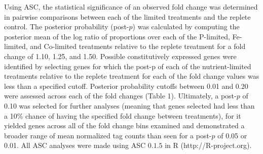 Using ASC, the statistical significance of an observed fold change was determined in pairwise comparisons between each of the limited treatments and the replete control. The posterior probability (post-$p$) was calculated by computing the posterior mean of the log ratio of proportions over each of the P-limited, Fe-limited, and Co-limited treatments relative to the replete treatment for a fold change of 1.10, 1.25, and 1.50. Possible constitutively expressed genes were identified by selecting genes for which the post-p of each of the nutrient-limited treatments relative to the replete treatment for each of the fold change values was less than a specified cutoff. Posterior probability cutoffs between 0.01 and 0.20 were assessed across each of the fold changes (Table 1). Ultimately, a post-$p$ of 0.10 was selected for further analyses (meaning that genes selected had less than a 10\% chance of having the specified fold change between treatments), for it yielded genes across all of the fold change bins examined and demonstrated a broader range of mean normalized tag counts than seen for a post-$p$ of 0.05 or 0.01. All ASC analyses were made using ASC $0.1.5$ in R (http://R-project.org). \par

